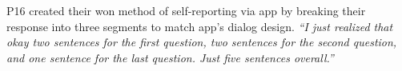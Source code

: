         P16 created their won method of self-reporting via \acl{app} by breaking their response into three segments to match \acl{app}'s dialog design.
            \textit{
                ``I just realized that okay two sentences for the first question, two sentences for the second question, and one sentence for the last question. Just five sentences overall.''
            }
        
        
        
